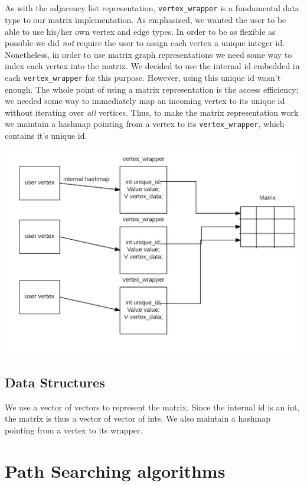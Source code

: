 \documentclass{article}
\begin{document}
\subsection{}
As with the adjacency list representation, \texttt{vertex\_wrapper} is a fundamental data type to our matrix implementation. As emphasized, we wanted the user to be able to use his/her own vertex and edge types. In order to be as flexible as possible we did \emph{not} require the user to assign each vertex a unique integer id. Nonetheless, in order to use matrix graph representations we need some way to index each vertex into the matrix. We decided to use the internal id embedded in each \texttt{vertex\_wrapper} for this purpose. However, using this unique id wasn't enough. The whole point of using a matrix representation is the access efficiency; we needed some way to immediately map an incoming vertex to its unique id without iterating over \emph{all} vertices. Thus, to make the matrix representation work we maintain a hashmap pointing from a vertex to its \texttt{vertex\_wrapper}, which contains it's unique id. 

\includegraphics{matrix}

\subsection{Data Structures}
We use a vector of vectors to represent the matrix. Since the internal id is an int, the matrix is thus a vector of vector of ints. We also maintain a hashmap pointing from a vertex to its wrapper.

\section{Path Searching algorithms}
\end{document}
